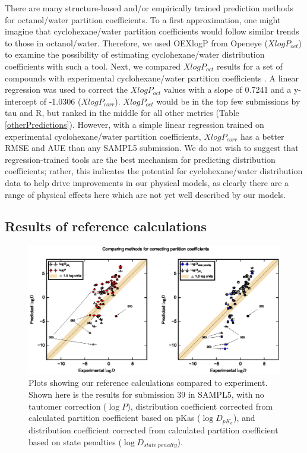 There are many structure-based and/or empirically trained prediction methods for octanol/water partition coefficients.
To a first approximation, one might imagine that cyclohexane/water partition coefficients would follow similar trends to those in octanol/water. 
Therefore, we used OEXlogP from Openeye ($XlogP_{oct}$) to examine the possibility of estimating cyclohexane/water distribution coefficients with such a tool. 
Next, we compared $XlogP_{oct}$ results for a set of compounds with experimental cyclohexane/water partition coefficients \cite{Leo:1971wu}. 
A linear regression was used to correct the $XlogP_{oct}$ values with a slope of 0.7241 and a y-intercept of -1.0306 ($XlogP_{corr}$). 
$XlogP_{oct}$ would be in the top few submissions by tau and R, but ranked in the middle for all other metrics (Table \ref{otherPredictions}). %
However, with a simple linear regression trained on experimental cyclohexane/water partition coefficients, $XlogP_{corr}$ has a better RMSE and AUE than any SAMPL5 submission. 
We do not wish to suggest that regression-trained tools are the best mechanism for predicting distribution coefficients; rather, this indicates the potential for cyclohexane/water distribution data to help drive improvements in our physical models, as clearly there are a range of physical effects here which are not yet well described by our models. 

\subsection{Results of reference calculations}
\label{results:6}

\begin{figure}
\includegraphics{MobleyPlots.eps}
\caption{Plots showing our reference calculations compared to experiment. Shown here is the results for submission 39 in SAMPL5, with no tautomer correction ($\log P$), distribution coefficient corrected from calculated partition coefficient based on pKas ($\log D_{pK_a}$), and distribution coefficient corrected from calculated partition coefficient based on state penalties ($\log D_{state\ penalty}$).}
\label{MobleyPlots}       
\end{figure}

